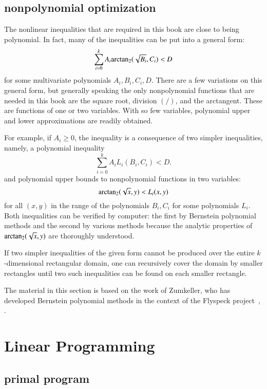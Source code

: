 \subsection{nonpolynomial optimization}

The nonlinear inequalities that are required in this book are close to
being polynomial.  In fact, many  of the inequalities can be put into a
general form:
\begin{equation}\label{eqn:ABCD}
\sum_{i=0}^k A_i {\operatorname{arctan_2}}(\sqrt{B_i},C_i) < D
\end{equation}
for some multivariate polynomials $A_i,B_i,C_i,D$.  There are a few
variations on this general form, but generally speaking the only
nonpolynomial functions that are needed in this book are the square
root, division $(/)$, and the arctangent.  These are functions of one
or two variables.  With so few variables, polynomial upper and lower
approximations are readily obtained.

For example, if $A_i\ge 0$, the inequality  is a
consequence of two simpler inequalities, namely,  a polynomial inequality
\[
\sum_{i=0}^k A_i L_i(B_i,C_i) < D.
\]
and polynomial upper bounds to nonpolynomial functions in two variables:
\begin{equation}\label{eqn:sL}
{\operatorname{arctan\ensuremath{_2}}}(\sqrt{x},y) < L_i(x,y)
\end{equation}
for all $(x,y)$ in the range of the polynomials $B_i,C_i$ for some
polynomials $L_i$.   Both inequalities can be verified by computer: the first
by Bernstein polynomial methods and the second
   by various methods because 
the analytic properties of ${\operatorname{arctan_2}}(\sqrt{x},y)$ are thoroughly
understood.

If two simpler inequalities of the given form cannot be produced over
the entire $k$-dimensional rectangular domain, one can recursively
cover the domain by smaller rectangles until two such inequalities can
be found on each smaller rectangle.

The material in this section is based on the work of Zumkeller, who
has developed Bernstein polynomial methods in the context of the
Flyspeck project~\cite{roland-thesis}, \cite{zumkeller-nonlinear}.


\section{Linear Programming}\label{sec:lp}

\subsection{primal program}

